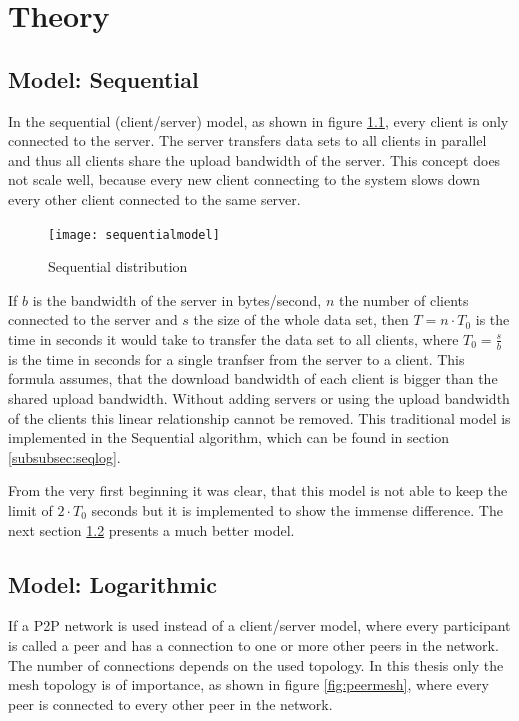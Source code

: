 \chapter{Theory}
\label{ch:theory}

\section{Model: Sequential}
\label{sec:sequentialmodel}
In the sequential (client/server) model, as shown in figure \ref{fig:sequentialmodel}, every client is only connected to the server. The server transfers data sets to all clients in parallel and thus all clients share the upload bandwidth of the server. This concept does not scale well, because every new client connecting to the system slows down every other client connected to the same server. 

\begin{figure}[H]
\centering
\texttt{[image: sequentialmodel]}
\caption{Sequential distribution}
\label{fig:sequentialmodel}
\end{figure}

If $b$ is the bandwidth of the server in bytes/second, $n$ the number of clients connected to the server and $s$ the size of the whole data set, then $T= n \cdot T_0$ is the time in seconds it would take to transfer the data set to all clients, where $T_0=\frac{s}{b}$ is the time in seconds for a single tranfser from the server to a client. This formula assumes, that the download bandwidth of each client is bigger than the shared upload bandwidth. Without adding servers or using the upload bandwidth of the clients this linear relationship cannot be removed. This traditional model is implemented in the Sequential algorithm, which can be found in section \ref{subsubsec:seqlog}.

From the very first beginning it was clear, that this model is not able to keep the limit of $2 \cdot T_0$ seconds but it is implemented to show the immense difference. The next section \ref{sec:logarithmicmodel} presents a much better model.

\pagebreak
\section{Model: Logarithmic}
\label{sec:logarithmicmodel}
If a P2P network is used instead of a client/server model, where every participant is called a peer and has a connection to one or more other peers in the network. The number of connections depends on the used topology. In this thesis only the mesh topology is of importance, as shown in figure \ref{fig:peermesh}, where every peer is connected to every other peer in the network.

